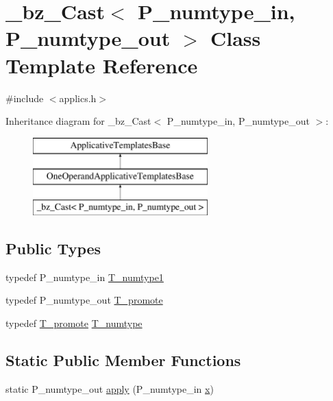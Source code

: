 \hypertarget{class__bz__Cast}{}\section{\+\_\+bz\+\_\+\+Cast$<$ P\+\_\+numtype\+\_\+in, P\+\_\+numtype\+\_\+out $>$ Class Template Reference}
\label{class__bz__Cast}


{\ttfamily \#include $<$applics.\+h$>$}

Inheritance diagram for \+\_\+bz\+\_\+\+Cast$<$ P\+\_\+numtype\+\_\+in, P\+\_\+numtype\+\_\+out $>$\+:\begin{figure}[H]
\begin{center}
\leavevmode
\includegraphics[height=3.000000cm]{class__bz__Cast}
\end{center}
\end{figure}
\subsection*{Public Types}
\begin{DoxyCompactItemize}
\item 
typedef P\+\_\+numtype\+\_\+in \hyperlink{class__bz__Cast_af1ac85e98c97ab910c25a2dab0e0bf93}{T\+\_\+numtype1}
\item 
typedef P\+\_\+numtype\+\_\+out \hyperlink{class__bz__Cast_a5111855b9362d0e6750d0f88a3ec6d8e}{T\+\_\+promote}
\item 
typedef \hyperlink{class__bz__Cast_a5111855b9362d0e6750d0f88a3ec6d8e}{T\+\_\+promote} \hyperlink{class__bz__Cast_a3fcb75e5ad757ce3555f4297cd09ec5e}{T\+\_\+numtype}
\end{DoxyCompactItemize}
\subsection*{Static Public Member Functions}
\begin{DoxyCompactItemize}
\item 
static P\+\_\+numtype\+\_\+out \hyperlink{class__bz__Cast_acc98ba5b4f2446e707037c4168841495}{apply} (P\+\_\+numtype\+\_\+in \hyperlink{vecnorm1_8cc_ac73eed9e41ec09d58f112f06c2d6cb63}{x})
\end{DoxyCompactItemize}


